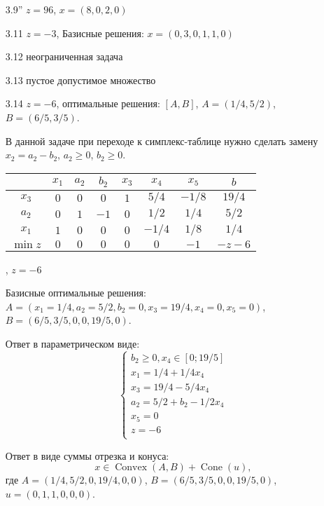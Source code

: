 \documentclass[12pt]{article}
\DeclareMathOperator{\Convex}{Convex}
\DeclareMathOperator{\cone}{Cone}
\begin{document}
\begin{enumerate}
  \item[3.9''] $z = 96$, $x = (8, 0, 2, 0)$
  
  \item[3.11] $z = -3$, Базисные решения: $x = (0, 3, 0, 1, 1, 0)$

  \item[3.12] неограниченная задача
  
  \item[3.13] пустое допустимое множество
  
  \item[3.14] $z=-6$, оптимальные решения: $[A, B]$, $A = (1/4, 5/2)$, $B = (6/5, 3/5)$.
  
  В данной задаче при переходе к симплекс-таблице нужно сделать замену $x_2 = a_2 - b_2$, $a_2 \geq 0$, $b_2 \geq 0$.

  \begin{tabular}{cccccccc}
    & $x_1$ & $a_2$ & $b_2$ & $x_3$ & $x_4$ & $x_5$ & $b$ \\
    \midrule 
  $x_3$ & $0$ & $0$ & $0$ & $1$ & $5/4$ & $-1/8$ & $19/4$ \\ 
  $a_2$ & $0$ & $1$ & $-1$ & $0$ & $1/2$ & $1/4$ & $5/2$ \\ 
  $x_1$ & $1$ & $0$ & $0$ & $0$ & $-1/4$ & $1/8$ & $1/4$ \\ 
  \midrule
  $\min z$ & $0$ & $0$ & $0$ & $0$ & $0$ & $-1$  & $-z - 6$ \\
  \end{tabular}, \quad $z = -6$

  Базисные оптимальные решения: $A = (x_1=1/4, a_2=5/2, b_2=0, x_3= 19/4, x_4 = 0, x_5 =0)$, $B = (6/5, 3/5, 0, 0, 19/5, 0)$.

  Ответ в параметрическом виде:
  \[
  \begin{cases}
    b_2 \geq 0, x_4 \in [0; 19/5] \\
    x_1 = 1/4 + 1/4 x_4 \\
    x_3 = 19/4 - 5/4 x_4 \\
    a_2 = 5/2 + b_2 - 1/2 x_4 \\
    x_5 = 0 \\
    z = -6 \\
  \end{cases}
  \]

  Ответ в виде суммы отрезка и конуса:
  \[
    x \in \Convex(A, B) + \cone(u),
  \]
  где $A = (1/4, 5/2, 0, 19/4, 0, 0)$, $B = (6/5, 3/5, 0, 0, 19/5, 0)$, $u =(0, 1, 1, 0, 0, 0)$.


\end{enumerate}
\end{document}
